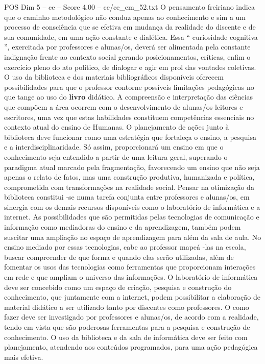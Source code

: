 \begin{textsample}{POS Dim 5 – ce – Score 4.00 – ce/ce\_em\_52.txt}
O pensamento freiriano indica que o caminho metodológico não conduz apenas ao conhecimento e sim a um processo de consciência que se efetiva em mudança da realidade do discente e de sua comunidade, em uma ação constante e dialética.
Essa “ curiosidade cognitiva ”, exercitada por professores e alunas/os, deverá ser alimentada pela constante indignação frente ao contexto social gerando posicionamentos, críticas, enfim o exercício pleno do ato político, de dialogar e agir em prol das vontades coletivas.
O uso da biblioteca e dos materiais bibliográficos disponíveis oferecem possibilidades para que o professor contorne possíveis limitações pedagógicas no que tange ao uso do \textbf{livro} didático.
A compreensão e interpretação das ciências que compõem a área ocorrem com o desenvolvimento de alunas/os leitores e escritores, uma vez que estas habilidades constituem competências essenciais no contexto atual do ensino de Humanas.
O planejamento de ações junto à biblioteca deve funcionar como uma estratégia que fortaleça o ensino, a pesquisa e a interdisciplinaridade.
Só assim, proporcionará um ensino em que o conhecimento seja entendido a partir de uma leitura geral, superando o paradigma atual marcado pela fragmentação, favorecendo um ensino que não seja apenas o relato de fatos, mas uma construção produtiva, humanizada e política, comprometida com transformações na realidade social.
Pensar na otimização da biblioteca constitui -se numa tarefa conjunta entre professores e alunas/os, em sinergia com os demais recursos disponíveis como o laboratório de informática e a internet.
As possibilidades que são permitidas pelas tecnologias de comunicação e informação como mediadoras do ensino e da aprendizagem, também podem suscitar uma ampliação no espaço de aprendizagem para além da sala de aula.
No ensino mediado por essas tecnologias, cabe ao professor mapeá -las na escola, buscar compreender de que forma e quando elas serão utilizadas, além de fomentar os usos das tecnologias como ferramentas que proporcionam interações em rede e que ampliam o universo das informações.
O laboratório de informática deve ser concebido como um espaço de criação, pesquisa e construção do conhecimento, que juntamente com a internet, podem possibilitar a elaboração de material didático a ser utilizado tanto por discentes como professores.
O como fazer deve ser investigado por professores e alunas/os, de acordo com a realidade, tendo em vista que são poderosas ferramentas para a pesquisa e construção de conhecimento.
O uso da biblioteca e da sala de informática deve ser feito com planejamento, atendendo aos conteúdos programados, para uma ação pedagógica mais efetiva.

\end{textsample}
